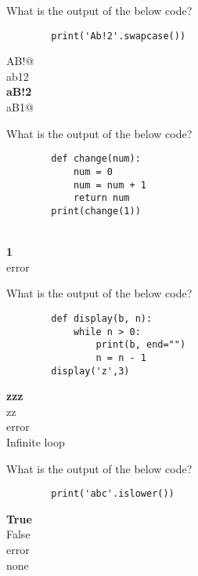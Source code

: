 \documentclass{exam}
\begin{document}
\begin{questions}
    \question What is the output of the below code?

    \begin{verbatim}
        print('Ab!2'.swapcase())
    \end{verbatim}

    \begin{oneparchoices}
        \choice AB!@ \\
        \choice ab12 \\
        \choice \textbf{aB!2} \\
        \choice aB1@  
    \end{oneparchoices}

    \question What is the output of the below code?

    \begin{verbatim}
        def change(num):
            num = 0
            num = num + 1
            return num
        print(change(1))
    \end{verbatim}

    \begin{oneparchoices}
         \\
        \choice \textbf{1} \\
        \choice error
    \end{oneparchoices}

    \question What is the output of the below code?

    \begin{verbatim}
        def display(b, n):
            while n > 0:
                print(b, end="")
                n = n - 1
        display('z',3)
    \end{verbatim}

    \begin{oneparchoices}
        \choice \textbf{zzz} \\
        \choice zz \\
        \choice error \\
        \choice Infinite loop   
    \end{oneparchoices}
    
    \question What is the output of the below code?

    \begin{verbatim}
        print('abc'.islower())
    \end{verbatim}
    \begin{oneparchoices}
        \choice \textbf{True} \\
        \choice False \\
        \choice error \\
        \choice none
    \end{oneparchoices}


\end{questions}
\end{document}
